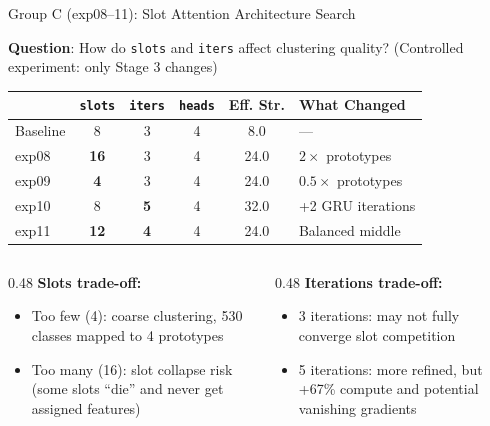 \documentclass[aspectratio=169, 10pt]{beamer}
\newcommand{\param}[1]{\textcolor{paramred}{\texttt{#1}}}
\begin{document}
\begin{frame}{Group C (exp08--11): Slot Attention Architecture Search}

\textbf{Question}: How do \param{slots} and \param{iters} affect clustering quality? (Controlled experiment: only Stage 3 changes)

\vspace{0.2cm}
\begin{center}
\small
\begin{tabular}{lccccl}
\toprule
& \param{slots} & \param{iters} & \param{heads} & \textbf{Eff. Str.} & \textbf{What Changed} \\
\midrule
\rowcolor{lightgray}
Baseline & 8 & 3 & 4 & 8.0 & --- \\
exp08 & \textbf{16} & 3 & 4 & 24.0 & $2\times$ prototypes \\
exp09 & \textbf{4} & 3 & 4 & 24.0 & $0.5\times$ prototypes \\
exp10 & 8 & \textbf{5} & 4 & 32.0 & +2 GRU iterations \\
exp11 & \textbf{12} & \textbf{4} & 4 & 24.0 & Balanced middle \\
\bottomrule
\end{tabular}
\end{center}

\vspace{0.3cm}
\begin{columns}[T]
\begin{column}{0.48\textwidth}
\textbf{Slots trade-off:}
\begin{itemize}
    \item Too few (4): coarse clustering, 530 classes mapped to 4 prototypes
    \item Too many (16): slot collapse risk (some slots ``die'' and never get assigned features)
\end{itemize}
\end{column}
\begin{column}{0.48\textwidth}
\textbf{Iterations trade-off:}
\begin{itemize}
    \item 3 iterations: may not fully converge slot competition
    \item 5 iterations: more refined, but +67\% compute and potential vanishing gradients
\end{itemize}
\end{column}
\end{columns}

\end{frame}
\end{document}
